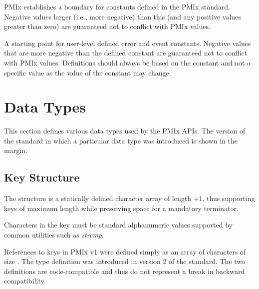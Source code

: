 \ac{PMIx} establishes a boundary for constants defined in the \ac{PMIx} standard. Negative values larger (i.e., more negative) than this (and any positive values greater than zero) are guaranteed not to conflict with \ac{PMIx} values.

\begin{constantdesc}
%
A starting point for user-level defined error and event constants.
Negative values that are more negative than the defined constant are guaranteed not to conflict with \ac{PMIx} values.
Definitions should always be based on the  constant and not a specific value as the value of the constant may change.
%
\end{constantdesc}



\section{Data Types}

This section defines various data types used by the \ac{PMIx} APIs. The version of the standard in which a particular data type was introduced is shown in the margin.

\subsection{Key Structure}

The  structure is a statically defined character array of length +1, thus supporting keys of maximum length  while preserving space for a mandatory  terminator.


Characters in the key must be standard alphanumeric values supported by common utilities such as \textit{strcmp}.

\adviceuserstart
References to keys in \ac{PMIx} v1 were defined simply as an array of characters of size . The  type definition was introduced in version 2 of the standard. The two definitions are code-compatible and thus do not represent a break in backward compatibility.

